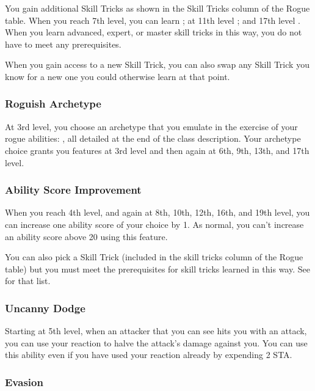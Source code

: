 You gain additional Skill Tricks as shown in the Skill Tricks column of the Rogue table. When you reach 7th level, you can learn ; at 11th level ; and 17th level . When you learn advanced, expert, or master skill tricks in this way, you do not have to meet any prerequisites.

When you gain access to a new Skill Trick, you can also swap any Skill Trick you know for a new one you could otherwise learn at that point.

\subsubsection{Roguish Archetype}

At 3rd level, you choose an archetype that you emulate in the exercise of your rogue abilities: , all detailed at the end of the class description. Your archetype choice grants you features at 3rd level and then again at 6th, 9th, 13th, and 17th level.

\subsubsection{Ability Score Improvement}

When you reach 4th level, and again at 8th, 10th, 12th, 16th, and 19th level, you can increase one ability score of your choice by 1. As normal, you can't increase an ability score above 20 using this feature.

You can also pick a Skill Trick (included in the skill tricks column of the Rogue table) but you must meet the prerequisites for skill tricks learned in this way. See  for that list.

\subsubsection{Uncanny Dodge}

Starting at 5th level, when an attacker that you can see hits you with an attack, you can use your reaction to halve the attack's damage against you. You can use this ability even if you have used your reaction already by expending 2 STA.

\subsubsection{Evasion}

